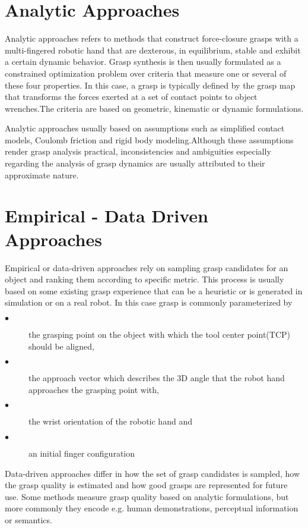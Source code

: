 \section{Analytic Approaches}
\par
Analytic approaches refers to methods that construct force-closure grasps with a  multi-fingered robotic hand that are dexterous, in equilibrium, stable and exhibit a certain dynamic behavior. Grasp synthesis is then usually formulated as a constrained  optimization problem over criteria that measure one or several of these four properties. In this case, a grasp is typically defined by the grasp map that transforms the forces exerted at a set of contact points to object wrenches.The criteria are based on  geometric, kinematic or dynamic formulations. 
\par
Analytic approaches usually based on assumptions such as simplified contact models, Coulomb friction and rigid body modeling.Although these assumptions render grasp analysis practical, inconsistencies and  ambiguities especially regarding the analysis of grasp dynamics are usually attributed
to their approximate nature.

\par
\section{Empirical - Data Driven Approaches}
\par
Empirical or data-driven approaches rely on sampling grasp candidates for an object and  ranking them according to specific metric. This process is usually based on some existing
grasp experience that can be a heuristic or is generated in simulation or on a real  robot. In this case grasp is commonly parameterized by
\begin{description}
\item [$\bullet$ ]the grasping point on the object with which the tool center point(TCP) should be aligned,
\item [$\bullet$ ]the approach  vector which  describes the 3D angle that the robot hand approaches the grasping point with,
\item [$\bullet$ ]the wrist orientation of the robotic hand and 
\item [$\bullet$ ]an initial finger configuration
\end{description}
Data-driven approaches differ in how the set of grasp candidates is sampled, how the grasp quality is estimated and how good  grasps are represented for future use. Some  methods measure grasp quality based on analytic formulations,  but more commonly they  encode e.g. human demonstrations, perceptual information or semantics.
\par
